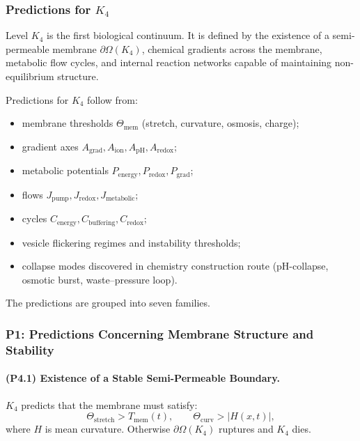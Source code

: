 

\subsubsection{Predictions for \texorpdfstring{$K_4$}{K_4}}
\label{sec:predictions-k4}

Level $K_4$ is the first biological continuum.  
It is defined by the existence of a semi-permeable membrane $\partial\Omega(K_4)$,
chemical gradients across the membrane, metabolic flow cycles, and internal
reaction networks capable of maintaining non-equilibrium structure.

Predictions for $K_4$ follow from:
\begin{itemize}
    \item membrane thresholds $\Theta_{\mathrm{mem}}$ (stretch, curvature, osmosis, charge);
    \item gradient axes $A_{\mathrm{grad}},A_{\mathrm{ion}},A_{\mathrm{pH}},A_{\mathrm{redox}}$;
    \item metabolic potentials $P_{\mathrm{energy}},P_{\mathrm{redox}},P_{\mathrm{grad}}$;
    \item flows $J_{\mathrm{pump}},J_{\mathrm{redox}},J_{\mathrm{metabolic}}$;
    \item cycles $C_{\mathrm{energy}},C_{\mathrm{buffering}},C_{\mathrm{redox}}$;
    \item vesicle flickering regimes and instability thresholds;
    \item collapse modes discovered in chemistry construction route (pH-collapse, osmotic burst, waste–pressure loop).
\end{itemize}

The predictions are grouped into seven families.

\subsubsection{P1: Predictions Concerning Membrane Structure and Stability}

\paragraph{(P4.1) Existence of a Stable Semi-Permeable Boundary.}
$K_4$ predicts that the membrane must satisfy:
\[
\Theta_{\mathrm{stretch}} > T_{\mathrm{mem}}(t), \qquad
\Theta_{\mathrm{curv}} > |H(x,t)|,
\]
where $H$ is mean curvature.  
Otherwise $\partial\Omega(K_4)$ ruptures and $K_4$ dies.

